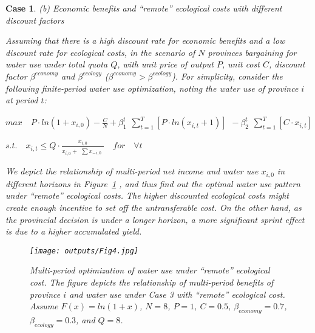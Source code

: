 \documentclass[default, sn-standardnature]{sn-jnl}
\newtheorem{case_appendix}{Case}
\begin{document}
\begin{case_appendix}
(b) Economic benefits and ``remote'' ecological costs with different discount factors

Assuming that there is a high discount rate for economic benefits and a low discount rate for ecological costs, in the scenario of $N$ provinces bargaining for water use under total quota $Q$, with unit price of output $P$, unit cost $C$, discount factor $\beta^{economy}$ and $\beta^{ecology}$ ($\beta^{economy} > \beta^{ecology}$). For simplicity, consider the following finite-period water use optimization, noting the water use of province $i$ at period $t$:

$ max \quad P \cdot ln(1+x_{i,0})-\frac{C}{N}+\beta_1^t \begin{matrix} \sum_{t=1}^T [P \cdot ln(x_{i,t}+1)]  \end{matrix} - \beta_2^t \begin{matrix} \sum_{t=1}^T [C \cdot x_{i,t}] \end{matrix}$

$s.t. \quad x_{i,t} \leq Q \cdot \frac{x_{i,0}}{x_{i,0} + \begin{matrix} \sum x_{-i,0} \end{matrix}} \quad for \quad \forall t$

We depict the relationship of multi-period net income and water use $x_{i,0}$ in different horizons in Figure~\ref{fig:remote}
, and thus find out the optimal water use pattern under ``remote'' ecological costs. The higher discounted ecological costs might create enough incentive to set off the untransferable cost. On the other hand, as the provincial decision is under a longer horizon, a more significant sprint effect is due to a higher accumulated yield.

\begin{figure}[H]
    \centering
    \texttt{[image: outputs/Fig4.jpg]}
    \caption{Multi-period optimization of water use under ``remote'' ecological cost. The figure depicts the relationship of multi-period benefits of province $i$ and water use under Case 3 with ``remote'' ecological cost. Assume $F(x)=ln(1+x)$, $N=8$, $P=1$, $C=0.5$, $\beta_{economy}=0.7$, $\beta_{ecology}=0.3$, and $Q=8$.}
    \label{fig:remote}
\end{figure}

\end{case_appendix}


% 
% 
\end{document}
